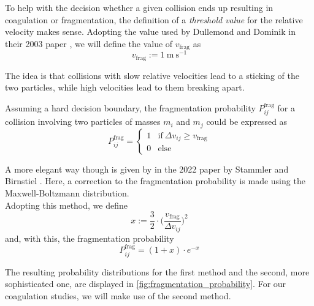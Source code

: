         To help with the decision whether a given collision ends up resulting in coagulation or
        fragmentation, the definition of a \textit{threshold value} for the relative velocity makes 
        sense. Adopting the value used by Dullemond and Dominik in their 2003 paper 
        \cite{dullemond_dominik_2023}, we will define the value of $v_\text{frag}$ as
        \begin{equation}
            v_\text{frag} := \SI{1}{\meter~\second^{-1}}
        \end{equation}

        The idea is that collisions with slow relative velocities lead to a sticking of the two 
        particles, while high velocities lead to them breaking apart. \\

        
        \clearpage

        Assuming a hard decision boundary, the fragmentation probability $P^\text{frag}_{ij}$ 
        for a collision involving two particles of masses $m_i$ and $m_j$ could be expressed as
        \begin{equation}
            P^\text{frag}_{ij}
            =
            \begin{cases}
                1 & \text{if}\ \Delta v_{ij} \geq v_\text{frag}\\
                0 & \text{else}
            \end{cases}
        \end{equation}

        A more elegant way though is given by in the 2022 paper by Stammler and Birnstiel 
        \cite{stammler_birnstiel_2022}. Here, a correction to the fragmentation probability is 
        made using the Maxwell-Boltzmann distribution. \\

        Adopting this method, we define
        \begin{equation}
            x:=\frac{3}{2}\cdot\bigg(
                \frac{v_\text{frag}}{\Delta v_{ij}}
            \bigg)^2
        \end{equation}
        and, with this, the fragmentation probability 
        \begin{equation}
            P^\text{frag}_{ij}=(1+x)\cdot e^{-x}
        \end{equation}

        The resulting probability distributions for the first method and the second, more
        sophisticated one, are displayed in \cref{fig:fragmentation_probability}.
        For our coagulation studies, we will make use of the second method.

